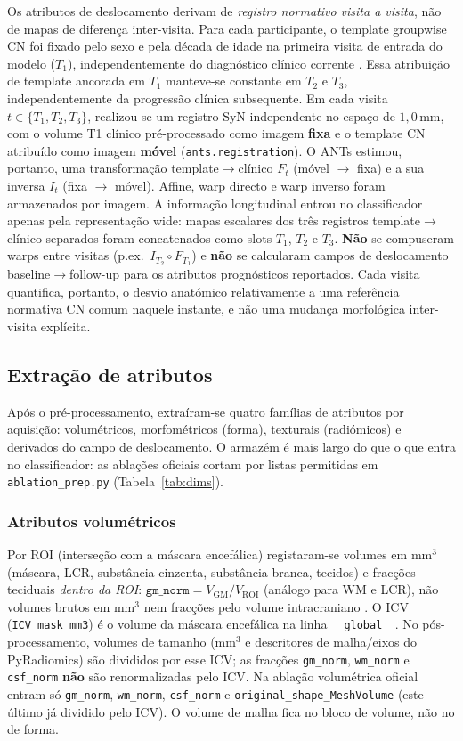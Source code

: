 \documentclass[review]{elsarticle}
\newcommand{\code}[1]{\texttt{#1}}
\begin{document}
	Os atributos de deslocamento derivam de \emph{registro normativo visita a visita}, não de mapas de diferença inter-visita. Para cada participante, o template groupwise CN foi fixado pelo sexo e pela década de idade na primeira visita de entrada do modelo ($T_1$), independentemente do diagnóstico clínico corrente \cite{wyman-2013}. Essa atribuição de template ancorada em $T_1$ manteve-se constante em $T_2$ e $T_3$, independentemente da progressão clínica subsequente.
	Em cada visita $t \in \{T_1,T_2,T_3\}$, realizou-se um registro SyN independente no espaço de $1{,}0$\,mm, com o volume T1 clínico pré-processado como imagem \textbf{fixa} e o template CN atribuído como imagem \textbf{móvel} (\code{ants.registration}). O ANTs estimou, portanto, uma transformação template$\to$clínico $F_t$ (móvel $\rightarrow$ fixa) e a sua inversa $I_t$ (fixa $\rightarrow$ móvel). Affine, warp directo e warp inverso foram armazenados por imagem.
	A informação longitudinal entrou no classificador apenas pela representação wide: mapas escalares dos três registros template$\to$clínico separados foram concatenados como slots $T_1$, $T_2$ e $T_3$. \textbf{Não} se compuseram warps entre visitas (p.ex.\ $I_{T_2}\circ F_{T_1}$) e \textbf{não} se calcularam campos de deslocamento baseline$\to$follow-up para os atributos prognósticos reportados. Cada visita quantifica, portanto, o desvio anatómico relativamente a uma referência normativa CN comum naquele instante, e não uma mudança morfológica inter-visita explícita.
	

	\subsection{Extração de atributos}\label{sec:feature-extraction}
	
	Após o pré-processamento, extraíram-se quatro famílias de atributos por aquisição: volumétricos, morfométricos (forma), texturais (radiómicos) e derivados do campo de deslocamento.
	O armazém é mais largo do que o que entra no classificador: as ablações oficiais cortam por listas permitidas em \code{ablation\_prep.py} (Tabela~\ref{tab:dims}).
	
	\subsubsection{Atributos volumétricos}
	Por ROI (interseção com a máscara encefálica) registaram-se volumes em mm$^3$ (máscara, LCR, substância cinzenta, substância branca, tecidos) e fracções teciduais \emph{dentro da ROI}: $\mathtt{gm\_norm}=V_{\mathrm{GM}}/V_{\mathrm{ROI}}$ (análogo para WM e LCR), não volumes brutos em mm$^3$ nem fracções pelo volume intracraniano \cite{wyman-2013}.
	O ICV (\code{ICV\_mask\_mm3}) é o volume da máscara encefálica na linha \code{\_\_global\_\_}.
	No pós-processamento, volumes de tamanho (mm$^3$ e descritores de malha/eixos do PyRadiomics) são divididos por esse ICV; as fracções \code{gm\_norm}, \code{wm\_norm} e \code{csf\_norm} \textbf{não} são renormalizadas pelo ICV.
	Na ablação volumétrica oficial entram só \code{gm\_norm}, \code{wm\_norm}, \code{csf\_norm} e \code{original\_shape\_MeshVolume} (este último já dividido pelo ICV). O volume de malha fica no bloco de volume, não no de forma.
	
\end{document}
